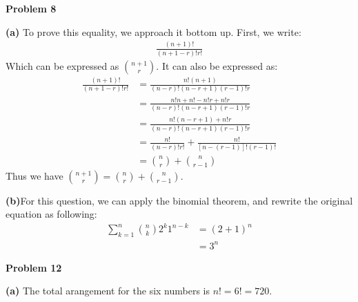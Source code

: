 \documentclass[12pt, letterpaper]{hmcpset}
\begin{document}

\begin{problem}
	\textbf{Problem 8}
\end{problem}
\begin{solution}
	\textbf{(a)} To prove this equality, we approach it bottom up. First, we write:
	\begin{align*}
		\frac{(n+1)!}{(n+1-r)!r!}
	\end{align*}
	Which can be expressed as ${{n+1}\choose{r}}$. It can also be expressed as:
	\begin{align*}
		\frac{(n+1)!}{(n+1-r)!r!}	&= \frac{n!(n+1)}{(n-r)!(n-r+1)(r-1)!r}	\\
									&= \frac{n!n+n!-n!r+n!r}{(n-r)!(n-r+1)(r-1)!r}	\\
									&= \frac{n!(n-r+1)+n!r}{(n-r)!(n-r+1)(r-1)!r}	\\
									&= \frac{n!}{(n-r)!r!} + \frac{n!}{[n-(r-1)]!(r-1)!}	\\
									&= {{n}\choose{r}} + {{n}\choose{r-1}}
	\end{align*}
	Thus we have ${{n+1}\choose{r}}={{n}\choose{r}}+{{n}\choose{r-1}}$.
\end{solution}

\begin{solution}
	\textbf{(b)}For this question, we can apply the binomial theorem, and rewrite the original equation as following:
	\begin{align*}
		\sum_{k=1}^{n}{{n}\choose{k}}2^k1^{n-k}	&= (2+1)^n	\\
												&= 3^n
	\end{align*}
\end{solution}
\begin{problem}
	\textbf{Problem 12}
\end{problem}
\begin{solution}
	\textbf{(a)} The total arangement for the six numbers is $n!=6!=720$.
\end{solution}
\end{document}

